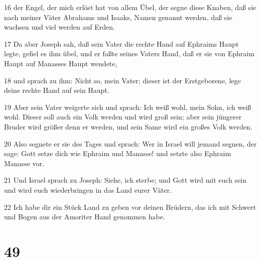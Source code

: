 \par 16 der Engel, der mich erlöst hat von allem Übel, der segne diese Knaben, daß sie nach meiner Väter Abrahams und Isaaks, Namen genannt werden, daß sie wachsen und viel werden auf Erden.
\par 17 Da aber Joseph sah, daß sein Vater die rechte Hand auf Ephraims Haupt legte, gefiel es ihm übel, und er faßte seines Vaters Hand, daß er sie von Ephraim Haupt auf Manasses Haupt wendete,
\par 18 und sprach zu ihm: Nicht so, mein Vater; dieser ist der Erstgeborene, lege deine rechte Hand auf sein Haupt.
\par 19 Aber sein Vater weigerte sich und sprach: Ich weiß wohl, mein Sohn, ich weiß wohl. Dieser soll auch ein Volk werden und wird groß sein; aber sein jüngerer Bruder wird größer denn er werden, und sein Same wird ein großes Volk werden.
\par 20 Also segnete er sie des Tages und sprach: Wer in Israel will jemand segnen, der sage: Gott setze dich wie Ephraim und Manasse! und setzte also Ephraim Manasse vor.
\par 21 Und Israel sprach zu Joseph: Siehe, ich sterbe; und Gott wird mit euch sein und wird euch wiederbringen in das Land eurer Väter.
\par 22 Ich habe dir ein Stück Land zu geben vor deinen Brüdern, das ich mit Schwert und Bogen aus der Amoriter Hand genommen habe.

\chapter{49}

